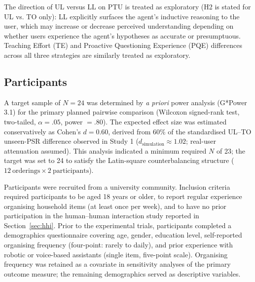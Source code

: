 \documentclass[manuscript,review,anonymous]{acmart}
\begin{document}

The direction of UL versus LL on PTU is treated as exploratory (H2 is stated for UL vs. TO only): LL explicitly surfaces the agent's inductive reasoning to the user, which may increase or decrease perceived understanding depending on whether users experience the agent's hypotheses as accurate or presumptuous. Teaching Effort (TE) and Proactive Questioning Experience (PQE) differences across all three strategies are similarly treated as exploratory.

\subsection{Participants}
\label{sec:study2:participants}

A target sample of $N = 24$ was determined by \textit{a priori} power analysis (G*Power 3.1) for the primary planned pairwise comparison (Wilcoxon signed-rank test, two-tailed, $\alpha = .05$, power $= .80$). The expected effect size was estimated conservatively as Cohen's $d = 0.60$, derived from 60\% of the standardised UL--TO unseen-PSR difference observed in Study 1 ($d_{\text{simulation}} \approx 1.02$; real-user attenuation assumed). This analysis indicated a minimum required $N$ of 23; the target was set to 24 to satisfy the Latin-square counterbalancing structure ($12~\text{orderings} \times 2~\text{participants}$).

Participants were recruited from a university community. Inclusion criteria required participants to be aged 18 years or older, to report regular experience organising household items (at least once per week), and to have no prior participation in the human--human interaction study reported in Section~\ref{sec:hhi}. Prior to the experimental trials, participants completed a demographics questionnaire covering age, gender, education level, self-reported organising frequency (four-point: rarely to daily), and prior experience with robotic or voice-based assistants (single item, five-point scale). Organising frequency was retained as a covariate in sensitivity analyses of the primary outcome measure; the remaining demographics served as descriptive variables.
\end{document}
